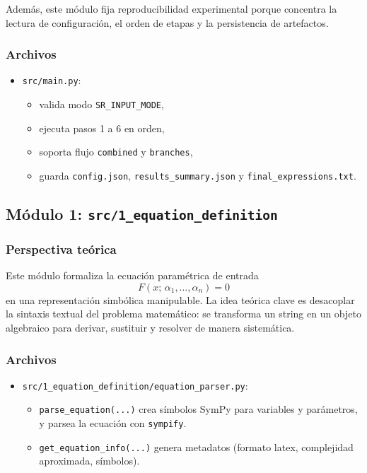 \documentclass[12pt]{article}
\begin{document}
Además, este módulo fija reproducibilidad experimental porque concentra la lectura de configuración, el orden de etapas y la persistencia de artefactos.

\subsubsection*{Archivos}
\begin{itemize}[leftmargin=1.5em]
    \item \texttt{src/main.py}:
    \begin{itemize}[leftmargin=1.5em]
        \item valida modo \texttt{SR\_INPUT\_MODE},
        \item ejecuta pasos 1 a 6 en orden,
        \item soporta flujo \texttt{combined} y \texttt{branches},
        \item guarda \texttt{config.json}, \texttt{results\_summary.json} y \texttt{final\_expressions.txt}.
    \end{itemize}
\end{itemize}

\subsection{Módulo 1: \texttt{src/1\_equation\_definition}}
\subsubsection*{Perspectiva teórica}
Este módulo formaliza la ecuación paramétrica de entrada
\[
F(x;\,\alpha_1,\ldots,\alpha_n)=0
\]
en una representación simbólica manipulable. La idea teórica clave es desacoplar la sintaxis textual del problema matemático: se transforma un string en un objeto algebraico para derivar, sustituir y resolver de manera sistemática.

\subsubsection*{Archivos}
\begin{itemize}[leftmargin=1.5em]
    \item \texttt{src/1\_equation\_definition/equation\_parser.py}:
    \begin{itemize}[leftmargin=1.5em]
        \item \texttt{parse\_equation(...)} crea símbolos SymPy para variables y parámetros, y parsea la ecuación con \texttt{sympify}.
        \item \texttt{get\_equation\_info(...)} genera metadatos (formato latex, complejidad aproximada, símbolos).
    \end{itemize}
\end{itemize}
\end{document}
